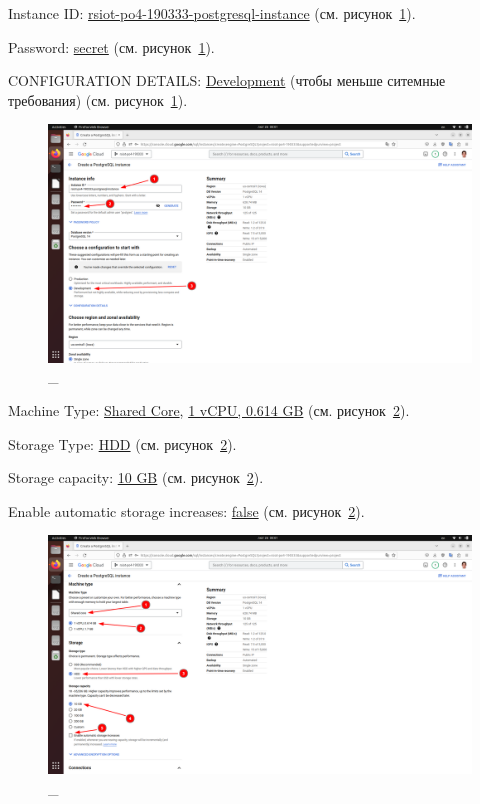 \documentclass[12pt, a4paper, simple]{eskdtext}
\begin{document}
  Instance ID: \underline{rsiot-po4-190333-postgresql-instance} (см. рисунок~\ref{fig:22}).

  Password: \underline{secret} (см. рисунок~\ref{fig:22}).

  CONFIGURATION DETAILS: \underline{Development} (чтобы меньше ситемные требования) (см. рисунок~\ref{fig:22}).

  \begin{figure}[!h]
    \centering
    \includegraphics[width=16cm]
    {images/2023-02-26_00-01-36.png}
    \caption{\_}
    \label{fig:22}
  \end{figure}

  Machine Type: \underline{Shared Core}, \underline{1 vCPU, 0.614 GB} (см. рисунок~\ref{fig:23}).

  Storage Type: \underline{HDD} (см. рисунок~\ref{fig:23}).

  Storage capacity: \underline{10 GB} (см. рисунок~\ref{fig:23}).

  Enable automatic storage increases: \underline{false} (см. рисунок~\ref{fig:23}).

  \begin{figure}[!h]
    \centering
    \includegraphics[width=16cm]
    {images/2023-02-26_00-02-31.png}
    \caption{\_}
    \label{fig:23}
  \end{figure}
\end{document}
